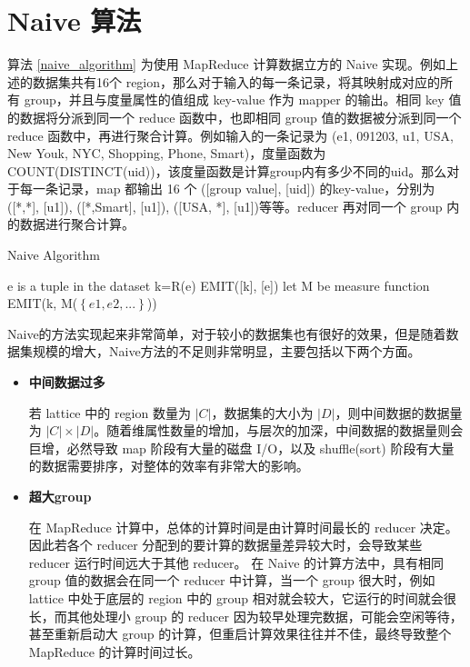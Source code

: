 \section{Naive 算法}

算法 \ref{naive_algorithm} 为使用 MapReduce 计算数据立方的 Naive 实现。例如上述的数据集共有16个 region，那么对于输入的每一条记录，将其映射成对应的所有 group，并且与度量属性的值组成 key-value 作为 mapper 的输出。相同 key 值的数据将分派到同一个 reduce 函数中，也即相同 group 值的数据被分派到同一个 reduce 函数中，再进行聚合计算。例如输入的一条记录为 (e1, 091203, u1, USA, New Youk, NYC, Shopping, Phone, Smart)，度量函数为 COUNT(DISTINCT(uid))，该度量函数是计算group内有多少不同的uid。那么对于每一条记录，map 都输出 16 个 ([group value], [uid]) 的key-value，分别为([*,*], [u1]), ([*,Smart], [u1]), ([USA, *], [u1])等等。reducer 再对同一个 group 内的数据进行聚合计算。

{\renewcommand\baselinestretch{1} 
\begin{algorithm}[!ht]
\caption{Naive Algorithm}
\label{naive_algorithm}
{\fontfamily{\familydefault}\selectfont

	\begin{algorithmic}[1] %
    	\State e is a tuple in the dataset
        	\State k=R(e)
        	\State EMIT([k], [e])
        \EndFor
   	 \EndFunction
     \State
     	\State let M be measure function
        \State EMIT(k, M($\left\{ e1,e2,...\right\}$))
     \EndFunction
	\end{algorithmic}
}
\end{algorithm}
\par}

Naive的方法实现起来非常简单，对于较小的数据集也有很好的效果，但是随着数据集规模的增大，Naive方法的不足则非常明显，主要包括以下两个方面。

\begin{itemize}

\item \textbf{中间数据过多}

若 lattice 中的 region 数量为 $|C|$，数据集的大小为 $|D|$，则中间数据的数据量为 $|C|\times |D|$。随着维属性数量的增加，与层次的加深，中间数据的数据量则会巨增，必然导致 map 阶段有大量的磁盘 I/O，以及 shuffle(sort) 阶段有大量的数据需要排序，对整体的效率有非常大的影响。

\item \textbf{超大group}

在 MapReduce 计算中，总体的计算时间是由计算时间最长的 reducer 决定。因此若各个 reducer 分配到的要计算的数据量差异较大时，会导致某些 reducer 运行时间远大于其他 reducer。 在 Naive 的计算方法中，具有相同 group 值的数据会在同一个 reducer 中计算，当一个 group 很大时，例如 lattice 中处于底层的 region 中的 group 相对就会较大，它运行的时间就会很长，而其他处理小 group 的 reducer 因为较早处理完数据，可能会空闲等待，甚至重新启动大 group 的计算，但重启计算效果往往并不佳，最终导致整个 MapReduce 的计算时间过长。

\end{itemize}


